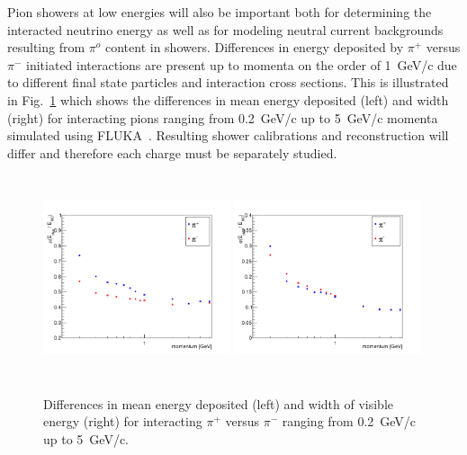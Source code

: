Pion showers at low energies will also be important both for determining the interacted neutrino energy as well
as for modeling neutral current backgrounds resulting from $\pi^o$ content in showers. Differences in energy deposited
by $\pi^+$ versus $\pi^-$ initiated interactions are present up to momenta on the order of 1~GeV/c due to different
final state particles and interaction cross sections. This is illustrated in 
Fig.~\ref{fig:pionshwr} which shows the differences in mean energy deposited (left) and width (right) 
for interacting pions ranging from 0.2~GeV/c up to 5~GeV/c momenta simulated using FLUKA~\cite{fluka05}.
Resulting shower calibrations and reconstruction will differ and therefore each charge must be separately
studied. 
\begin{figure}[h!]
  \centering
\includegraphics[width=0.49\textwidth,height=6.0cm]{figures/pipimean}
\includegraphics[width=0.49\textwidth,height=6.0cm]{figures/pipisigma}
  \caption{Differences in mean energy deposited (left) and width of visible energy (right) 
for interacting $\pi^+$ versus $\pi^-$ ranging from 0.2~GeV/c up to 5~GeV/c. 
}
\label{fig:pionshwr}
\end{figure}


